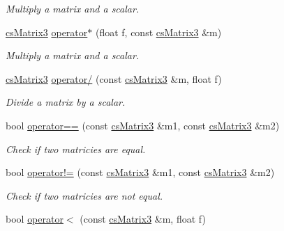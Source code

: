 \begin{DoxyCompactItemize}
\begin{DoxyCompactList}\small\item\em Multiply a matrix and a scalar. \end{DoxyCompactList}\item 
\hyperlink{classcsMatrix3}{cs\+Matrix3} \hyperlink{classcsMatrix3_a47cccf5c33cd784e669f1993eac6ac46}{operator$\ast$} (float f, const \hyperlink{classcsMatrix3}{cs\+Matrix3} \&m)\hypertarget{classcsMatrix3_a47cccf5c33cd784e669f1993eac6ac46}{}\label{classcsMatrix3_a47cccf5c33cd784e669f1993eac6ac46}

\begin{DoxyCompactList}\small\item\em Multiply a matrix and a scalar. \end{DoxyCompactList}\item 
\hyperlink{classcsMatrix3}{cs\+Matrix3} \hyperlink{classcsMatrix3_ab79793d2fd598218302ce2f5d059dad5}{operator/} (const \hyperlink{classcsMatrix3}{cs\+Matrix3} \&m, float f)\hypertarget{classcsMatrix3_ab79793d2fd598218302ce2f5d059dad5}{}\label{classcsMatrix3_ab79793d2fd598218302ce2f5d059dad5}

\begin{DoxyCompactList}\small\item\em Divide a matrix by a scalar. \end{DoxyCompactList}\item 
bool \hyperlink{classcsMatrix3_a2569c6a8aa03572650ced4af397326fe}{operator==} (const \hyperlink{classcsMatrix3}{cs\+Matrix3} \&m1, const \hyperlink{classcsMatrix3}{cs\+Matrix3} \&m2)\hypertarget{classcsMatrix3_a2569c6a8aa03572650ced4af397326fe}{}\label{classcsMatrix3_a2569c6a8aa03572650ced4af397326fe}

\begin{DoxyCompactList}\small\item\em Check if two matricies are equal. \end{DoxyCompactList}\item 
bool \hyperlink{classcsMatrix3_a6ad89b5e6d2deb08585c51ee77c91665}{operator!=} (const \hyperlink{classcsMatrix3}{cs\+Matrix3} \&m1, const \hyperlink{classcsMatrix3}{cs\+Matrix3} \&m2)\hypertarget{classcsMatrix3_a6ad89b5e6d2deb08585c51ee77c91665}{}\label{classcsMatrix3_a6ad89b5e6d2deb08585c51ee77c91665}

\begin{DoxyCompactList}\small\item\em Check if two matricies are not equal. \end{DoxyCompactList}\item 
bool \hyperlink{classcsMatrix3_a8ae3db841c7ab66b35b7160152faaa8f}{operator$<$} (const \hyperlink{classcsMatrix3}{cs\+Matrix3} \&m, float f)\hypertarget{classcsMatrix3_a8ae3db841c7ab66b35b7160152faaa8f}{}\label{classcsMatrix3_a8ae3db841c7ab66b35b7160152faaa8f}


\end{DoxyCompactItemize}
